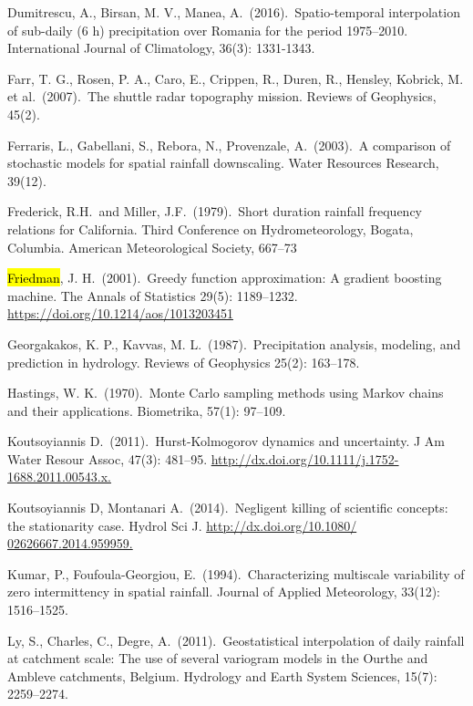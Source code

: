 \begin{thebibliography}{9}
Dumitrescu, A., Birsan, M. V., Manea, A.\ (2016).\ Spatio-temporal interpolation of sub-daily (6 h) precipitation over Romania for the period 1975--2010.
International Journal of Climatology, 36(3): 1331-1343.

Farr, T. G., Rosen, P. A., Caro, E., Crippen, R., Duren, R., Hensley,  Kobrick, M. et al.\ (2007).\ The shuttle radar topography mission.
Reviews of Geophysics, 45(2).

Ferraris, L., Gabellani, S., Rebora, N.,  Provenzale, A.\ (2003).\
A comparison of stochastic models for spatial rainfall downscaling.
Water Resources Research, 39(12).

Frederick, R.H.\ and Miller, J.F.\ (1979).\ Short duration rainfall frequency relations for California.
Third Conference on Hydrometeorology, Bogata, Columbia.
American Meteorological Society, 667--73

\hl{Friedman}, J. H.\ (2001).\ Greedy function approximation: A gradient boosting machine.
The Annals of Statistics 29(5): 1189--1232. \url{https://doi.org/10.1214/aos/1013203451}

Georgakakos, K. P., Kavvas, M. L.\ (1987).\ Precipitation analysis, modeling, and prediction in hydrology.
Reviews of Geophysics 25(2): 163--178.

Hastings, W. K.\ (1970).\ Monte Carlo sampling methods using Markov chains and their applications.
Biometrika, 57(1): 97--109.

Koutsoyiannis D.\ (2011).\ Hurst-Kolmogorov dynamics and uncertainty.
J Am Water Resour Assoc, 47(3): 481--95.
\url{http://dx.doi.org/10.1111/j.1752- 1688.2011.00543.x.}

Koutsoyiannis D, Montanari A.\ (2014).\ Negligent killing of scientific concepts: the stationarity case.
Hydrol Sci J. \url{http://dx.doi.org/10.1080/ 02626667.2014.959959.}

Kumar, P., Foufoula-Georgiou, E.\ (1994).\ Characterizing multiscale variability of zero intermittency in spatial rainfall.
Journal of Applied Meteorology, 33(12): 1516--1525.

Ly, S., Charles, C., Degre, A.\ (2011).\ Geostatistical interpolation of daily rainfall at catchment scale:
The use of several variogram models in the Ourthe and Ambleve catchments, Belgium.
Hydrology and Earth System Sciences, 15(7): 2259--2274.


\end{thebibliography}
